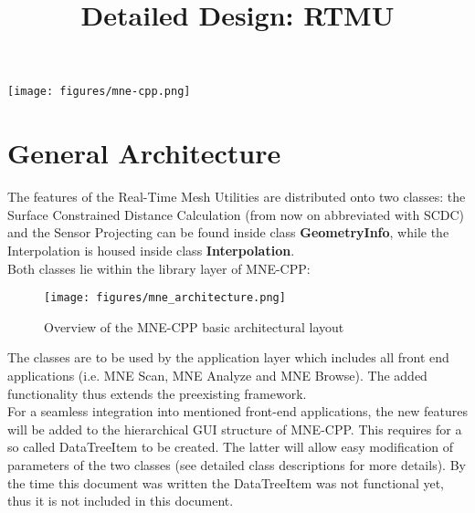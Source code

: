 





	
\title{Detailed Design: RTMU}
\vspace{3 in}
\maketitle

\texttt{[image: figures/mne-cpp.png]}

\clearpage


\tableofcontents

\clearpage
\section{General Architecture}
The features of the Real-Time Mesh Utilities are distributed onto two classes: the Surface Constrained Distance Calculation (from now on abbreviated with SCDC) and the Sensor Projecting can be found inside class \textbf{GeometryInfo}, while the Interpolation is housed inside class \textbf{Interpolation}.\\
Both classes lie within the library layer of MNE-CPP:

\begin{figure}[h]
	\begin{center}
		\texttt{[image: figures/mne\_architecture.png]}
		\caption{Overview of the MNE-CPP basic architectural layout}
	\end{center}
\end{figure}

The classes are to be used by the application layer which includes all front end applications (i.e. MNE Scan, MNE Analyze and MNE Browse).
The added functionality thus extends the preexisting framework.\\
For a seamless integration into mentioned front-end applications, the new features will be added to the hierarchical GUI structure of MNE-CPP. This requires for a so called DataTreeItem to be created. The latter will allow easy modification of parameters of the two classes (see detailed class descriptions for more details). By the time this document was written the DataTreeItem was not functional yet, thus it is not included in this document.


\clearpage

